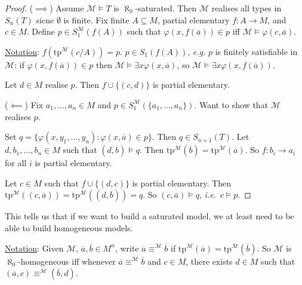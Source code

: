 \documentclass[]{article}
\theoremstyle{custhm}
\theoremstyle{cusdef}
\theoremstyle{custhm}
\theoremstyle{custhm}
\theoremstyle{custhm}
\theoremstyle{ex}
\theoremstyle{custhm}
\theoremstyle{cusdef}
\theoremstyle{remark}
\theoremstyle{remark}
\theoremstyle{numremark}
\newcommand{\ra}{\rightarrow}
\newcommand{\ie}{\textit{i.e.}}
\renewcommand{\it}[1]{\textit{#1}}
\newcommand{\M}{\mathcal{M}}
\renewcommand{\phi}{\varphi}
\renewcommand{\bar}{\overline}
\newcommand{\tp}{\textrm{tp}}
\renewcommand{\subset}{\subseteq}
\begin{document}
\begin{proof}
($\implies$) Assume $\M\models T$ is $\aleph_0$-saturated. Then $\M$ realises all types in $S_n(T)$ sicne $\emptyset$ is finite. Fix finite $A\subset M$, partial elementary $f:A\ra M$, and $c\in M$. Define $p\in S_1^\M(f(A))$ such that $\phi(x,f(\bar{a}))\in p$ iff $\M\models \phi(c,\bar{a})$.

\underline{Notation}: $f(\tp^\M(c/A)) = p$. $p \in S_1(f(A))$, \it{e.g.} $p$ is finitely satisfiable in $\M$: if $\phi(x,f(\bar{a}))\in p$ then $\M\models \exists x \phi(x,\bar{a})$, so $\M\models \exists x \phi(x,f(\bar{a}))$.

Let $d \in M$ realise $p$. Then $f\cup\{(c,d)\}$ is partial elementary.

($\impliedby$) Fix $a_1,\dots,a_n\in M$ and $p\in S_1^\M(\{a_1,\dots,a_n\})$. Want to show that $\M$ realises $p$.

Set $q = \{\phi(x,y_1,\dots,y_n):\phi(x,\bar{a})\in p\}$. Then $q \in S_{n+1}(T)$. Let $d,b_1,\dots,b_n \in M$ such that $(d,\bar{b})\models q$. Then $\tp^\M(\bar{b}) = \tp^\M(\bar{a})$. So $f:b_i\ra a_i$ for all $i$ is partial elementary.

Let $c\in M$ such that $f\cup \{(d,c)\}$ is partial elementary. Then $\tp^\M((c,\bar{a})) = \tp^\M((d,\bar{b})) = q$. So $(c,\bar{a})\models q$, \ie\ $c\models p$.
\end{proof}

This tells us that if we want to build a saturated model, we at least need to be able to build homogeneous models.

\underline{Notation}: Given $\M$, $\bar{a},\bar{b}\in M^n$, write $\bar{a}\equiv^\M\bar{b}$ if $\tp^\M(\bar{a}) = \tp^\M(\bar{b})$. So $\M$ is $\aleph_0$-homogeneous iff whenever $\bar{a}\equiv^\M\bar{b}$ and $c\in M$, there exists $d\in M$ such that $(\bar{a},c) \equiv^\M (\bar{b},d)$.
\end{document}
